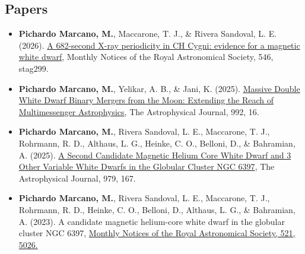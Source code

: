\documentclass[letterpaper,10pt]{article}
\begin{document}
\subsection*{Papers}
\begin{itemize}[label=$\blacktriangleright$]




        \subsubsection*{First author}

        
              \item  \textbf{Pichardo Marcano, M.}, Maccarone, T. J., \& Rivera Sandoval, L. E. (2026). \href{https://scixplorer.org/abs/2026MNRAS.546ag299P/abstract}{A 682-second X-ray periodicity in CH Cygni: evidence for a magnetic white dwarf}, Monthly Notices of the Royal Astronomical Society, 546, stag299.



                    \item  \textbf{Pichardo Marcano, M.}, Yelikar, A. B., \& Jani, K. (2025). \href{https://scixplorer.org/abs/2025ApJ...992...16P/abstract}{Massive Double White Dwarf Binary Mergers from the Moon: Extending the Reach of Multimessenger Astrophysics}, The Astrophysical Journal, 992, 16.

                



\item \textbf{Pichardo Marcano, M.}, Rivera Sandoval, L. E., Maccarone, T. J., Rohrmann, R. D., Althaus, L. G., Heinke, C. O., Belloni, D., \& Bahramian, A. (2025). \href{https://scixplorer.org/abs/2025ApJ...979..167P/abstract}{A Second Candidate Magnetic Helium Core White Dwarf and 3 Other Variable White Dwarfs in the Globular Cluster NGC 6397}, The Astrophysical Journal, 979, 167.

                \item \textbf{Pichardo Marcano, M.}, Rivera Sandoval, L. E., Maccarone, T. J., Rohrmann, R. D., Heinke, C. O., Belloni, D., Althaus, L. G., \& Bahramian, A. (2023). A candidate magnetic helium-core white dwarf in the globular cluster NGC 6397, \href{https://ui.adsabs.harvard.edu/abs/2023MNRAS.521.5026P/abstract}{Monthly Notices of the Royal Astronomical Society, 521, 5026.}




\end{itemize}
\end{document}
